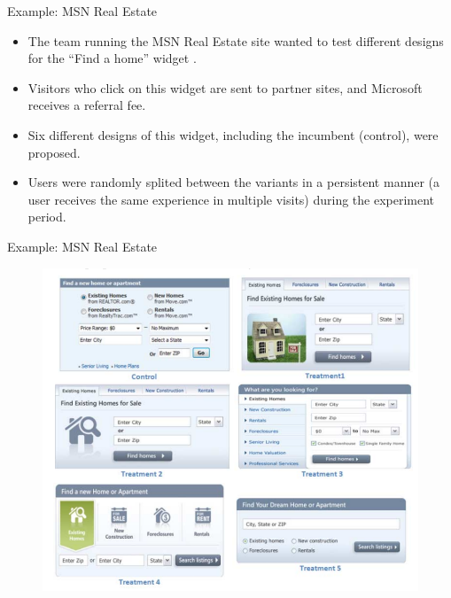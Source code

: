 \documentclass[handout]{beamer}
\begin{document}
\begin{frame}{Example: MSN Real Estate}
\scriptsize{


\begin{itemize}

\item The team running the MSN Real Estate site wanted to test different designs for the ``Find a home'' widget \cite{kohavi2009online}.

\item Visitors who click on this widget are sent to partner sites, and Microsoft receives a referral fee. 

\item Six different designs of this widget, including the incumbent (control), were proposed.

\item Users were randomly splited between the variants in a persistent manner (a user receives the same experience in multiple visits) during the experiment period.

\end{itemize}



} 
\end{frame}


\begin{frame}{Example: MSN Real Estate}


\begin{figure}[h!]
	\centering
	\includegraphics[scale=0.4]{pics/widgets.png}
\end{figure}




\end{frame}
\end{document}
